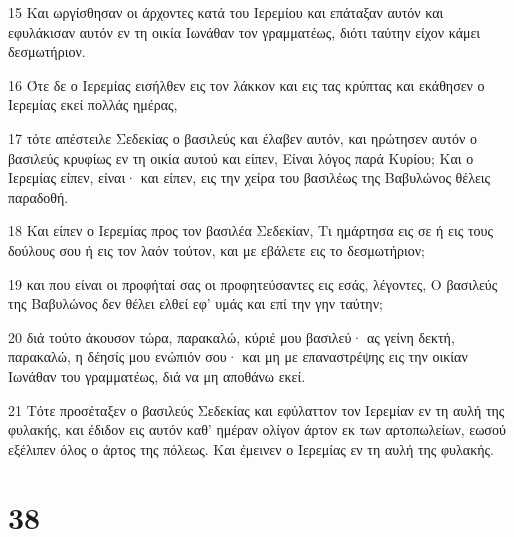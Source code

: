 \par 15 Και ωργίσθησαν οι άρχοντες κατά του Ιερεμίου και επάταξαν αυτόν και εφυλάκισαν αυτόν εν τη οικία Ιωνάθαν τον γραμματέως, διότι ταύτην είχον κάμει δεσμωτήριον.
\par 16 Ότε δε ο Ιερεμίας εισήλθεν εις τον λάκκον και εις τας κρύπτας και εκάθησεν ο Ιερεμίας εκεί πολλάς ημέρας,
\par 17 τότε απέστειλε Σεδεκίας ο βασιλεύς και έλαβεν αυτόν, και ηρώτησεν αυτόν ο βασιλεύς κρυφίως εν τη οικία αυτού και είπεν, Είναι λόγος παρά Κυρίου; Και ο Ιερεμίας είπεν, είναι· και είπεν, εις την χείρα του βασιλέως της Βαβυλώνος θέλεις παραδοθή.
\par 18 Και είπεν ο Ιερεμίας προς τον βασιλέα Σεδεκίαν, Τι ημάρτησα εις σε ή εις τους δούλους σου ή εις τον λαόν τούτον, και με εβάλετε εις το δεσμωτήριον;
\par 19 και που είναι οι προφήταί σας οι προφητεύσαντες εις εσάς, λέγοντες, Ο βασιλεύς της Βαβυλώνος δεν θέλει ελθεί εφ' υμάς και επί την γην ταύτην;
\par 20 διά τούτο άκουσον τώρα, παρακαλώ, κύριέ μου βασιλεύ· ας γείνη δεκτή, παρακαλώ, η δέησίς μου ενώπιόν σου· και μη με επαναστρέψης εις την οικίαν Ιωνάθαν του γραμματέως, διά να μη αποθάνω εκεί.
\par 21 Τότε προσέταξεν ο βασιλεύς Σεδεκίας και εφύλαττον τον Ιερεμίαν εν τη αυλή της φυλακής, και έδιδον εις αυτόν καθ' ημέραν ολίγον άρτον εκ των αρτοπωλείων, εωσού εξέλιπεν όλος ο άρτος της πόλεως. Και έμεινεν ο Ιερεμίας εν τη αυλή της φυλακής.

\chapter{38}

